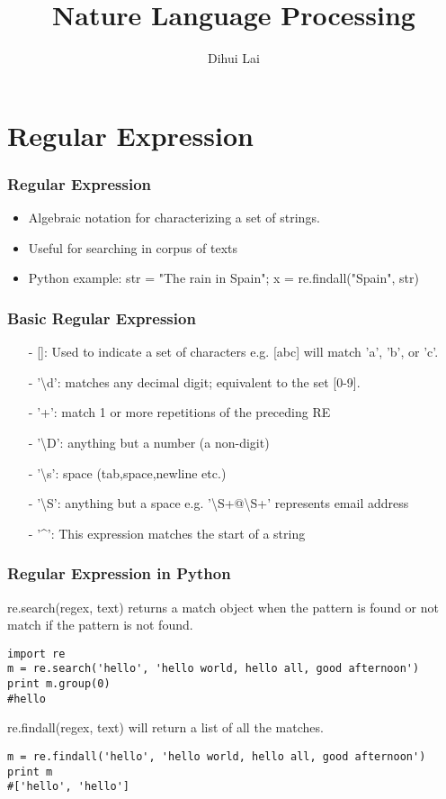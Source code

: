 \documentclass[notheorems, aspectratio=54]{beamer}
\title{Nature Language Processing}
\author{Dihui Lai}
\institute[WUSTL]{dlai@wustl.edu}
\begin{document}
\begin{frame}
    \titlepage
\end{frame}

\section{Regular Expression}

\begin{frame}
   \frametitle{Regular Expression}
\begin{itemize}
\item Algebraic notation for characterizing a set of strings.
\item Useful for searching in corpus of texts
\item Python example: str = "The rain in Spain"; x = re.findall("Spain", str)
\end{itemize}
\end{frame}

\begin{frame}
   \frametitle{Basic Regular Expression}
\begin{itemize}
\item[-][]: Used to indicate a set of characters e.g. [abc] will match 'a', 'b', or 'c'.
\item[-]'\textbackslash d': matches any decimal digit; equivalent to the set [0-9].
\item[-] '+': match 1 or more repetitions of the preceding RE
\item[-]'\textbackslash D': anything but a number (a non-digit)	
\item[-] '\textbackslash s': space (tab,space,newline etc.)
\item[-] '\textbackslash S': anything but a space e.g. '\textbackslash S+@\textbackslash S+' represents email address
\item[-]'\textasciicircum': This expression matches the start of a string
\end{itemize}

\end{frame}
\begin{frame}[fragile]
\frametitle{Regular Expression in Python}
re.search(regex, text) returns a match object when the pattern is found or not match if the pattern is not found.
\begin{lstlisting}
import re
m = re.search('hello', 'hello world, hello all, good afternoon')
print m.group(0)
#hello
\end{lstlisting}

re.findall(regex, text) will return a list of all the matches.
\begin{lstlisting}
m = re.findall('hello', 'hello world, hello all, good afternoon')
print m
#['hello', 'hello']
\end{lstlisting}
\end{frame}
\end{document}
